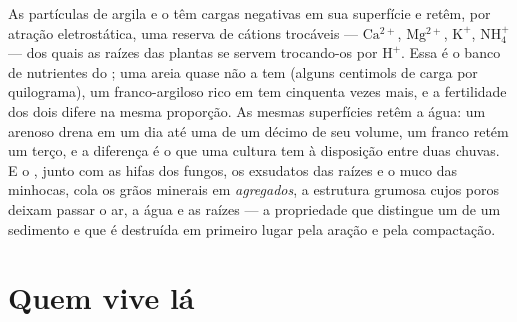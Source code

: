 \begin{proposition}\label{prop:b2:living-soil:cec}
As partículas de argila e o  têm cargas negativas em sua superfície
e retêm, por atração eletrostática, uma reserva de cátions trocáveis ---
$\mathrm{Ca^{2+}}$, $\mathrm{Mg^{2+}}$, $\mathrm{K^{+}}$, $\mathrm{NH_4^{+}}$ --- dos quais
as raízes das plantas se servem trocando-os por $\mathrm{H^{+}}$. Essa
\emph{} é o banco de nutrientes do ;
uma areia quase não a tem (alguns centimols de carga por quilograma),
um franco-argiloso rico em  tem cinquenta vezes mais, e a
fertilidade dos dois difere na mesma proporção. As mesmas superfícies
retêm a água: um  arenoso drena em um dia até uma \emph{} de um décimo de seu volume, um  franco retém um terço, e a
diferença é o que uma cultura tem à disposição entre duas chuvas. E o
, junto com as hifas dos fungos, os exsudatos das raízes e o muco
das minhocas, cola os grãos minerais em \emph{agregados}, a estrutura
grumosa cujos poros deixam passar o ar, a água e as raízes --- a
propriedade que distingue um  de um sedimento e que é destruída em
primeiro lugar pela aração e pela compactação.
\end{proposition}

\section{Quem vive lá}

